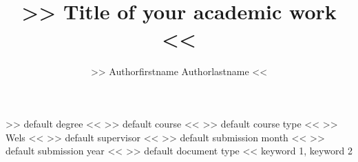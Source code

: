 	\title
		{>> Title of your academic work <<}
	\author
		{>> Authorfirstname Authorlastname <<}


	\degree		
		{>> default degree <<}	%
	\course		
		{>> default course <<}
	\coursestype
		{>> default course type <<}
	\location	
		{>> Wels <<}
	\supervisor	
		{>> default supervisor <<}
	\submonth	
		{>> default submission month <<}
	\subyear	
		{>> default submission year <<}
	\doctype	
		{>> default document type <<}
	\keywords
		{keyword 1, keyword 2}
